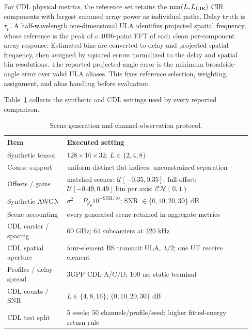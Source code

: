 For CDL physical metrics, the reference set retains the $\min(L,L_{\rm CIR})$ CIR components with largest summed array power as individual paths. Delay truth is $\tau_p$. A half-wavelength one-dimensional ULA identifies projected spatial frequency, whose reference is the peak of a 4096-point FFT of each clean per-component array response. Estimated bins are converted to delay and projected spatial frequency, then assigned by squared errors normalized to the delay and spatial bin resolutions. The reported projected-angle error is the minimum broadside-angle error over valid ULA aliases. This fixes reference selection, weighting, assignment, and alias handling before evaluation.

Table~\ref{tab:system_params} collects the synthetic and CDL settings used by every reported comparison.

\begin{table}[t]
\centering
\caption{Scene-generation and channel-observation protocol.}
\label{tab:system_params}
\footnotesize
\setlength{\tabcolsep}{3pt}
\begin{tabular}{@{}p{}p{}@{}}
\toprule
Item & Executed setting \\
\midrule
Synthetic tensor & $128\times16\times32$; $L\in\{2,4,8\}$ \\
Coarse support & uniform distinct flat indices; unconstrained separation \\
Offsets / gains & matched scenes: $\mathcal{U}[-0.35,0.35]$; full-offset: $\mathcal{U}[-0.49,0.49]$ bin per axis; $\mathcal{CN}(0,1)$ \\
Synthetic AWGN & $\sigma^2=P_{\mathcal{Y}_0}10^{-\mathrm{SNR}/10}$; SNR $\in\{0,10,20,30\}$ dB \\
Scene accounting & every generated scene retained in aggregate metrics \\
\midrule
CDL carrier / spacing & 60 GHz; 64 subcarriers at 120 kHz \\
CDL spatial aperture & four-element BS transmit ULA, $\lambda/2$; one UT receive element \\
Profiles / delay spread & 3GPP CDL-A/C/D; 100 ns; static terminal \\
CDL counts / SNR & $L\in\{4,8,16\}$; $\{0,10,20,30\}$ dB \\
CDL test split & 5 seeds; 50 channels/profile/seed; higher fitted-energy return rule \\
\bottomrule
\end{tabular}
\end{table}
